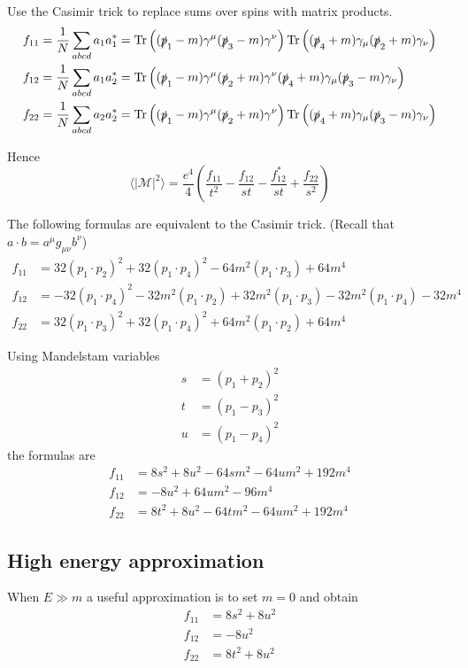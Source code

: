 \documentclass[12pt]{article}
\begin{document}
\noindent
Use the Casimir trick to replace sums over spins with matrix products.
\begin{align*}
f_{11}&=\frac{1}{N}\sum_{abcd}a_1a_1^*=
\mathop{\rm Tr}\left(
(\slashed{p}_1-m)\gamma^\mu(\slashed{p}_3-m)\gamma^\nu
\right)
\mathop{\rm Tr}\left(
(\slashed{p}_4+m)\gamma_\mu(\slashed{p}_2+m)\gamma_\nu
\right)
\\
f_{12}&=\frac{1}{N}\sum_{abcd}a_1a_2^*=
\mathop{\rm Tr}\left(
(\slashed{p}_1-m)\gamma^\mu(\slashed{p}_2+m)\gamma^\nu
(\slashed{p}_4+m)\gamma_\mu(\slashed{p}_3-m)\gamma_\nu
\right)
\\
f_{22}&=\frac{1}{N}\sum_{abcd}a_2a_2^*=
\mathop{\rm Tr}\left(
(\slashed{p}_1-m)\gamma^\mu(\slashed{p}_2+m)\gamma^\nu
\right)
\mathop{\rm Tr}\left(
(\slashed{p}_4+m)\gamma_\mu(\slashed{p}_3-m)\gamma_\nu
\right)
\end{align*}

\noindent
Hence
\begin{equation*}
\langle|\mathcal{M}|^2\rangle
=\frac{e^4}{4}
\left(
\frac{f_{11}}{t^2} - \frac{f_{12}}{st} -
\frac{f_{12}^*}{st} + \frac{f_{22}}{s^2}
\right)
\end{equation*}

The following formulas are equivalent to the Casimir trick.
(Recall that $a\cdot b=a^\mu g_{\mu\nu}b^\nu$)
\begin{align*}
f_{11}&=
32(p_1\cdot p_2)^2
+32(p_1\cdot p_4)^2
-64 m^2(p_1\cdot p_3)
+64 m^4
\\
f_{12}&=
-32 (p_1\cdot p_4)^2
-32 m^2 (p_1\cdot p_2)
+32 m^2 (p_1\cdot p_3)
-32 m^2 (p_1\cdot p_4)
-32 m^4
\\
f_{22}&=
32(p_1\cdot p_3)^2
+32(p_1\cdot p_4)^2
+64 m^2(p_1\cdot p_2)
+64 m^4
\end{align*}

\noindent
Using Mandelstam variables
\begin{align*}
s&=(p_1+p_2)^2
\\
t&=(p_1-p_3)^2
\\
u&=(p_1-p_4)^2
\end{align*}
the formulas are
\begin{align*}
f_{11} &= 8 s^2 + 8 u^2 - 64 s m^2 - 64 u m^2 + 192 m^4
\\
f_{12} &= -8 u^2 + 64 u m^2 - 96 m^4
\\
f_{22} &= 8 t^2 + 8 u^2 - 64 t m^2 - 64 u m^2 + 192 m^4
\end{align*}

\subsection*{High energy approximation}
When $E\gg m$ a useful approximation is to set $m=0$ and obtain
\begin{align*}
f_{11}&= 8 s^2 + 8 u^2\\
f_{12}&= -8 u^2\\
f_{22}&= 8 t^2 + 8 u^2
\end{align*}
\end{document}
